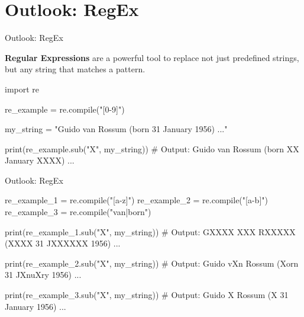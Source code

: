 \section{Outlook: RegEx}

\begin{frame}[plain]
    \sectionpage
\end{frame}

\begin{frame}[fragile]{Outlook: RegEx}

    \textbf{Regular Expressions} are a powerful tool to replace not just predefined strings, but any string that matches a pattern. 

    \begin{pythoncode}

import re

re_example = re.compile("[0-9]")

my_string = "Guido van Rossum (born 31 January 1956) ..."

print(re_example.sub("X", my_string))
# Output: Guido van Rossum (born XX January XXXX) ...

    \end{pythoncode}


\end{frame}

\begin{frame}[fragile]{Outlook: RegEx}

    \begin{pythoncode}

re_example_1 = re.compile("[a-z]")
re_example_2 = re.compile("[a-b]")
re_example_3 = re.compile("van|born")

print(re_example_1.sub("X", my_string))
# Output: GXXXX XXX RXXXXX (XXXX 31 JXXXXXX 1956) ...

print(re_example_2.sub("X", my_string))
# Output: Guido vXn Rossum (Xorn 31 JXnuXry 1956) ...

print(re_example_3.sub("X", my_string))
# Output: Guido X Rossum (X 31 January 1956) ...

    \end{pythoncode}


\end{frame}


